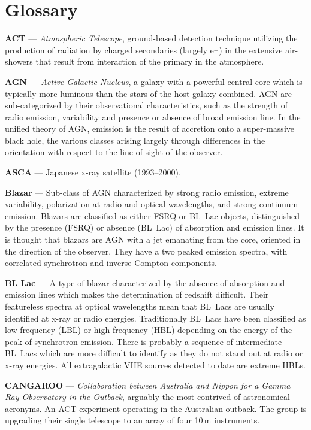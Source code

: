 \chapter{Glossary}
\label{APP::JARGON}

\textbf{ACT} --- \textit{Atmospheric \Cerenkov Telescope}, ground-based
\Gray detection technique utilizing the production of \Cerenkov radiation
by charged secondaries (largely e$^\pm$) in the extensive air-showers
that result from interaction of the primary in the atmosphere.

\textbf{AGN} --- \textit{Active Galactic Nucleus}, a galaxy with a powerful
central core which is typically more luminous than the stars of the
host galaxy combined. AGN are sub-categorized by their observational
characteristics, such as the strength of radio emission, variability
and presence or absence of broad emission line. In the unified theory
of AGN, emission is the result of accretion onto a super-massive black
hole, the various classes arising largely through differences in the
orientation with respect to the line of sight of the observer.

\textbf{ASCA} --- Japanese x-ray satellite (1993--2000).

\textbf{Blazar} --- Sub-class of AGN characterized by strong radio 
emission, extreme variability, polarization at radio and optical
wavelengths, and strong continuum emission. Blazars are classified as
either FSRQ or BL~Lac objects, distinguished by the presence (FSRQ) or
absence (BL~Lac) of absorption and emission lines. It is thought that
blazars are AGN with a jet emanating from the core, oriented in the
direction of the observer. They have a two peaked emission spectra,
with correlated synchrotron and inverse-Compton components.

\textbf{BL Lac} --- A type of blazar characterized by the absence of 
absorption and emission lines which makes the determination of
redshift difficult. Their featureless spectra at optical wavelengths
mean that BL~Lacs are usually identified at x-ray or radio energies.
Traditionally BL~Lacs have been classified as low-frequency (LBL) or
high-frequency (HBL) depending on the energy of the peak of
synchrotron emission. There is probably a sequence of intermediate
BL~Lacs which are more difficult to identify as they do not stand out
at radio or x-ray energies. All extragalactic VHE \Gray sources
detected to date are extreme HBLs.

\textbf{CANGAROO} --- \textit{Collaboration between Australia and Nippon 
for a Gamma Ray Observatory in the Outback}, arguably the most
contrived of astronomical acronyms. An ACT experiment operating in the
Australian outback. The group is upgrading their single telescope to an
array of four 10\,m instruments.

